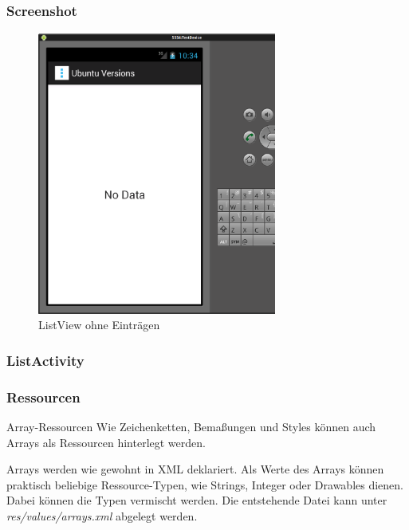 \begin{frame}
   \frametitle{Screenshot}
   \begin{figure}[h!]
     \centering
     \includegraphics[width=0.7\textwidth]{pictures/hello_list_empty.ps}
     \caption{
        ListView ohne Einträgen
     }
     \label{fig:hello_list_empty}
   \end{figure}
\end{frame}

\begin{frame}
   \frametitle{ListActivity}
   
\end{frame}

\begin{frame}
   \frametitle{Ressourcen}

   \begin{alertblock}{Array-Ressourcen}
      Wie Zeichenketten, Bemaßungen und Styles können auch Arrays als Ressourcen 
      hinterlegt werden.

      \vspace{3mm}

      Arrays werden wie gewohnt in XML deklariert. Als Werte des Arrays können 
      praktisch beliebige Ressource-Typen, wie Strings, Integer oder Drawables dienen. 
      Dabei können die Typen vermischt werden. Die entstehende Datei kann unter 
      \emph{res/values/arrays.xml} abgelegt werden.

      \vspace{3mm}

       
   \end{alertblock}
\end{frame}

